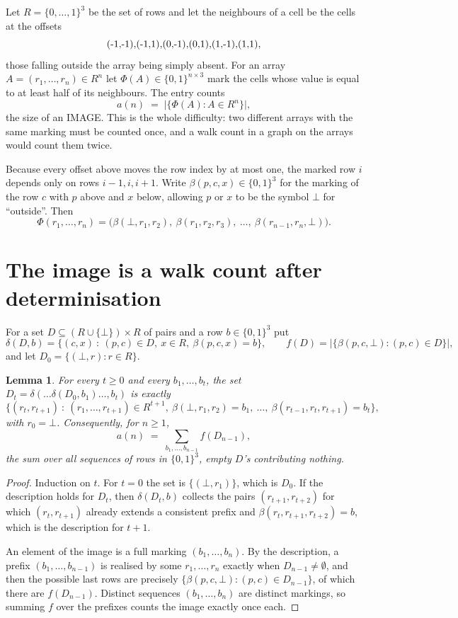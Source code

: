 \documentclass[11pt,a4paper]{article}
\theoremstyle{plain}
\newtheorem{lemma}[theorem]{Lemma}
\theoremstyle{definition}
\begin{document}
Let $R=\{0,\dots,1\}^{3}$ be the set of rows and let the neighbours of a cell be the
cells at the offsets
\[
$(-1,-1)$, $(-1,1)$, $(0,-1)$, $(0,1)$, $(1,-1)$, $(1,1)$,
\]
those falling outside the array being simply absent. For an array
$A=(r_1,\dots,r_n)\in R^n$ let $\Phi(A)\in\{0,1\}^{n\times3}$ mark the cells whose value
is equal to at least half of its neighbours. The entry counts
\[
a(n)\;=\;\bigl|\{\Phi(A):A\in R^n\}\bigr| ,
\]
the size of an IMAGE. This is the whole difficulty: two different arrays with the same marking
must be counted once, and a walk count in a graph on the arrays would count them twice.

Because every offset above moves the row index by at most one, the marked row $i$ depends only
on rows $i-1,i,i+1$. Write $\beta(p,c,x)\in\{0,1\}^{3}$ for the marking of the row $c$
with $p$ above and $x$ below, allowing $p$ or $x$ to be the symbol $\bot$ for ``outside''.
Then
\[
\Phi(r_1,\dots,r_n)=\bigl(\beta(\bot,r_1,r_2),\ \beta(r_1,r_2,r_3),\ \dots,\
\beta(r_{n-1},r_n,\bot)\bigr).
\]

\section{The image is a walk count after determinisation}

For a set $D\subseteq(R\cup\{\bot\})\times R$ of pairs and a row $b\in\{0,1\}^{3}$ put
\[
\delta(D,b)=\{(c,x)\ :\ (p,c)\in D,\ x\in R,\ \beta(p,c,x)=b\},\qquad
f(D)=\bigl|\{\beta(p,c,\bot):(p,c)\in D\}\bigr| ,
\]
and let $D_0=\{(\bot,r):r\in R\}$.

\begin{lemma}\label{lem:det}
For every $t\ge0$ and every $b_1,\dots,b_t$, the set
$D_t=\delta(\dots\delta(D_0,b_1)\dots,b_t)$ is exactly
\[
\{(r_t,r_{t+1})\ :\ (r_1,\dots,r_{t+1})\in R^{t+1},\ \beta(\bot,r_1,r_2)=b_1,\ \dots,\
\beta(r_{t-1},r_t,r_{t+1})=b_t\} ,
\]
with $r_0=\bot$. Consequently, for $n\ge1$,
\[
a(n)\;=\;\sum_{b_1,\dots,b_{n-1}}f(D_{n-1}),
\]
the sum over all sequences of rows in $\{0,1\}^{3}$, empty $D$'s contributing nothing.
\end{lemma}

\begin{proof}
Induction on $t$. For $t=0$ the set is $\{(\bot,r_1)\}$, which is $D_0$. If the description
holds for $D_t$, then $\delta(D_t,b)$ collects the pairs $(r_{t+1},r_{t+2})$ for which
$(r_t,r_{t+1})$ already extends a consistent prefix and
$\beta(r_t,r_{t+1},r_{t+2})=b$, which is the description for $t+1$.

An element of the image is a full marking $(b_1,\dots,b_n)$. By the description, a prefix
$(b_1,\dots,b_{n-1})$ is realised by some $r_1,\dots,r_n$ exactly when $D_{n-1}\neq
\emptyset$, and then the possible last rows are precisely
$\{\beta(p,c,\bot):(p,c)\in D_{n-1}\}$, of which there are $f(D_{n-1})$. Distinct
sequences $(b_1,\dots,b_n)$ are distinct markings, so summing $f$ over the prefixes counts the
image exactly once each.
\end{proof}
\end{document}
